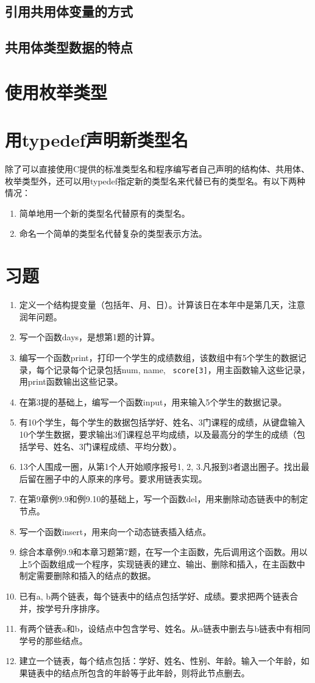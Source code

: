 \subsection{引用共用体变量的方式}
\subsection{共用体类型数据的特点}
\section{使用枚举类型}
\section{用typedef声明新类型名}
除了可以直接使用C提供的标准类型名和程序编写者自己声明的结构体、共用体、枚举类型外，还可以用typedef指定新的类型名来代替已有的类型名。有以下两种情况：
\begin{enumerate}
	\item 简单地用一个新的类型名代替原有的类型名。
	\item 命名一个简单的类型名代替复杂的类型表示方法。
\end{enumerate}
\section{习题}
\begin{enumerate}
	\item 定义一个结构提变量（包括年、月、日）。计算该日在本年中是第几天，注意润年问题。
	\item 写一个函数days，是想第1题的计算。
	\item 编写一个函数print，打印一个学生的成绩数组，该数组中有5个学生的数据记录，每个记录每个记录包括num, name, \verb| score[3]|，用主函数输入这些记录，用print函数输出这些记录。
	\item 在第3提的基础上，编写一个函数input，用来输入5个学生的数据记录。
	\item 有10个学生，每个学生的数据包括学好、姓名、3门课程的成绩，从键盘输入10个学生数据，要求输出3们课程总平均成绩，以及最高分的学生的成绩（包括学号、姓名、3门课程成绩、平均分数）。
	\item 13个人围成一圈，从第1个人开始顺序报号1, 2, 3.凡报到3者退出圈子。找出最后留在圈子中的人原来的序号。要求用链表实现。
	\item 在第9章例9.9和例9.10的基础上，写一个函数del，用来删除动态链表中的制定节点。
	\item 写一个函数insert，用来向一个动态链表插入结点。
	\item 综合本章例9.9和本章习题第7题，在写一个主函数，先后调用这个函数。用以上5个函数组成一个程序，实现链表的建立、输出、删除和插入，在主函数中制定需要删除和插入的结点的数据。
	\item 已有a, b两个链表，每个链表中的结点包括学好、成绩。要求把两个链表合并，按学号升序排序。
	\item 有两个链表a和b，设结点中包含学号、姓名。从a链表中删去与b链表中有相同学号的那些结点。
	\item 建立一个链表，每个结点包括：学好、姓名、性别、年龄。输入一个年龄，如果链表中的结点所包含的年龄等于此年龄，则将此节点删去。
\end{enumerate}
